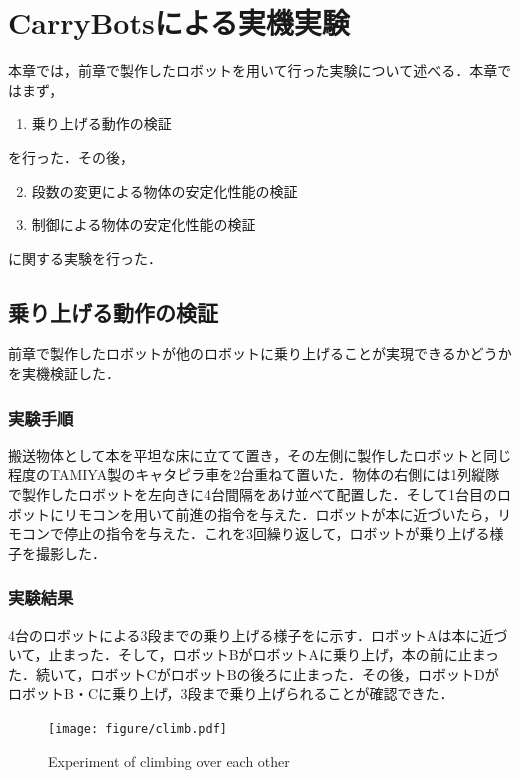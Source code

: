 \chapter{CarryBotsによる実機実験}
本章では，前章で製作したロボットを用いて行った実験について述べる．本章ではまず，
\begin{enumerate}
    \item 乗り上げる動作の検証
\end{enumerate}
を行った．その後，
\begin{enumerate}
    \setcounter{enumi}{1}
    \item 段数の変更による物体の安定化性能の検証
    \item 制御による物体の安定化性能の検証
\end{enumerate}
に関する実験を行った．


\section{乗り上げる動作の検証}
前章で製作したロボットが他のロボットに乗り上げることが実現できるかどうかを実機検証した．

\subsection{実験手順}
搬送物体として本を平坦な床に立てて置き，その左側に製作したロボットと同じ程度のTAMIYA製のキャタピラ車を2台重ねて置いた．物体の右側には1列縦隊で製作したロボットを左向きに4台間隔をあけ並べて配置した．そして1台目のロボットにリモコンを用いて前進の指令を与えた．ロボットが本に近づいたら，リモコンで停止の指令を与えた．これを3回繰り返して，ロボットが乗り上げる様子を撮影した．

\subsection{実験結果}
4台のロボットによる3段までの乗り上げる様子をに示す．ロボットAは本に近づいて，止まった．そして，ロボットBがロボットAに乗り上げ，本の前に止まった．続いて，ロボットCがロボットBの後ろに止まった．その後，ロボットDがロボットB・Cに乗り上げ，3段まで乗り上げられることが確認できた．

\begin{figure}[tb]
  \centering
  \texttt{[image: figure/climb.pdf]}
  \caption{Experiment of climbing over each other}
  \label{fig:climb}
\end{figure}

